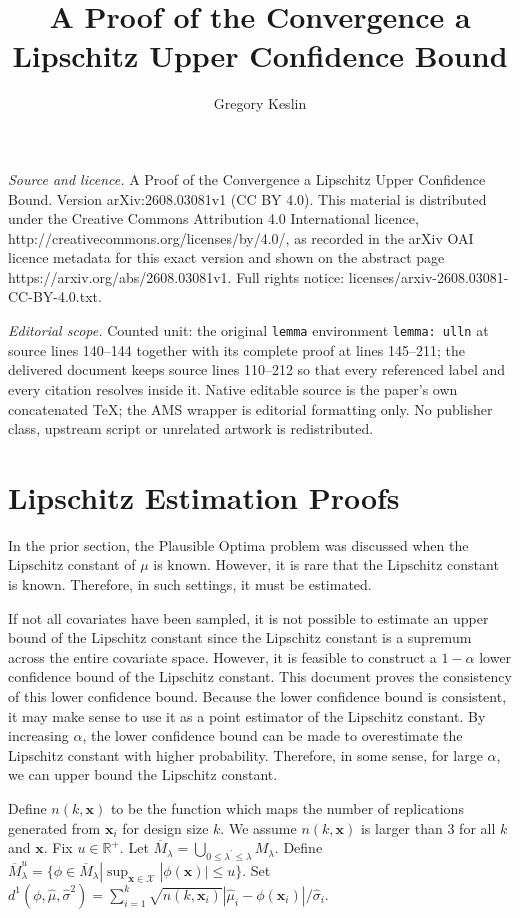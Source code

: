 \documentclass[10pt,a4paper]{amsart}
\newcommand{\spa}[1]{\text{{$\mathcal{#1}$}}}
\newcommand{\des}{\ensuremath{\bm{x}}}
\newcommand{\vect}[1]{\ensuremath{\bm{#1}}}
\begin{document}
\title[A Proof of the Convergence a Lipschitz Upper Confidence Boun]{A Proof of the Convergence a Lipschitz Upper Confidence Bound}
\author{Gregory Keslin}
\date{}
\maketitle
\noindent\emph{Source and licence.} A Proof of the Convergence a Lipschitz Upper Confidence Bound. Version arXiv:2608.03081v1 (CC BY 4.0). This material is distributed under the Creative Commons Attribution 4.0 International licence, http://creativecommons.org/licenses/by/4.0/, as recorded in the arXiv OAI licence metadata for this exact version and shown on the abstract page https://arxiv.org/abs/2608.03081v1. Full rights notice: licenses/arxiv-2608.03081-CC-BY-4.0.txt.\par\smallskip
\noindent\textit{Editorial scope.} Counted unit: the original \texttt{lemma} environment \texttt{lemma: ulln} at source lines 140--144 together with its complete proof at lines 145--211; the delivered document keeps source lines 110--212 so that every referenced label and every citation resolves inside it. Native editable source is the paper's own concatenated TeX; the AMS wrapper is editorial formatting only. No publisher class, upstream script or unrelated artwork is redistributed.
\section{Lipschitz Estimation Proofs}
In the prior section, the Plausible Optima problem was discussed when the Lipschitz constant of $\mu$ is known. However, it is rare that the Lipschitz constant is known. Therefore, in such settings, it must be estimated. 

If not all covariates have been sampled, it is not possible to estimate an upper bound of the Lipschitz constant since the Lipschitz constant is a supremum across the entire covariate space. However, it is feasible to construct a $1-\alpha$ lower confidence bound of the Lipschitz constant. This document proves the consistency of this lower confidence bound. Because the lower confidence bound is consistent, it may make sense to use it as a point estimator of the Lipschitz constant. By increasing $\alpha$, the lower confidence bound can be made to overestimate the Lipschitz constant with higher probability. Therefore, in some sense, for large $\alpha$, we can upper bound the Lipschitz constant. 

Define $n(k,\vect{x})$ to be the function which maps the number of replications generated from $\vect{x}_i$ for design size $k$. We assume $n(k,\vect{x})$ is larger than 3 for all $k$ and $\vect{x}$. Fix $u\in \mathbb{R}^+$. Let $\overline{M}_\lambda=\bigcup_{0\leq \lambda^\prime \leq \lambda }M_\lambda$. Define $\overline{M}^u_\lambda=\{\phi \in \overline{M}_\lambda|\sup_{\vect{x}\in \spa{X}}|\phi(\vect{x})|\leq u\}$. Set $d^1(\phi,\hat{\mu},\hat{\sigma}^2)=\sum_{i=1}^k\sqrt{n(k,\des_i)}|\hat{\mu}_i-\phi(\des_i)|/\hat{\sigma}_i$.
\end{document}
